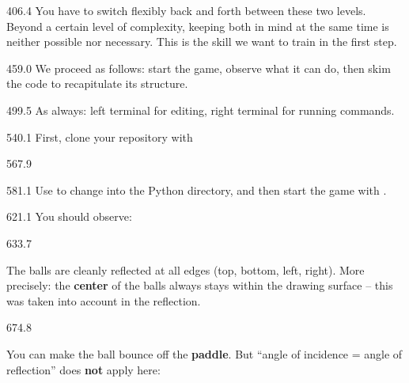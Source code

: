 \documentclass{aslab}
\begin{document}
\begin{region}[pitch=13.15]{406.4}
You have to switch flexibly back and forth between these two levels. Beyond a
certain level of complexity, keeping both in mind at the same time is neither
possible nor necessary. This is the skill we want to train in the first step.
\end{region}

\begin{region}[pitch=13.2]{459.0}
We proceed as follows: start the game, observe what it can do, then skim the
code to recapitulate its structure.
\end{region}

\begin{region}[pitch=13.3]{499.5}
As always: left terminal for editing, right terminal for running commands.
\end{region}

\begin{region}[pitch=14.3]{540.1}
First, clone your repository with
\end{region}

\begin{region}{567.9}
\end{region}

\begin{region}[pitch=13.5]{581.1}
Use  to change into the Python directory, and then
start the game with .
\end{region}

\begin{region}{621.1}
You should observe:
\end{region}

\begin{region}[pitch=14]{633.7}
\begin{dashlist}
\item The balls are cleanly reflected at all edges (top, bottom, left, right).
  More precisely: the \textbf{center} of the balls always stays within the
  drawing surface -- this was taken into account in the reflection.
\end{dashlist}
\end{region}

\begin{region}[pitch=15.3]{674.8}
\begin{dashlist}
\item You can make the ball bounce off the \textbf{paddle}. But ``angle of
  incidence = angle of reflection'' does \textbf{not} apply here:
\end{dashlist}
\end{region}
\end{document}
